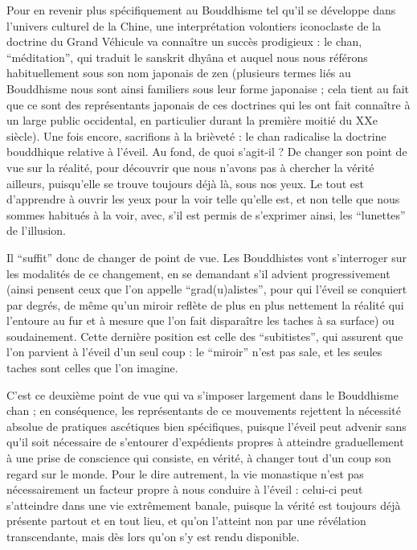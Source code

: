 \documentclass[11pt,a4paper]{article} %
\begin{document}
Pour en revenir plus spécifiquement au Bouddhisme tel qu'il se développe dans
l'univers culturel de la Chine, une interprétation volontiers iconoclaste de la doctrine du
Grand Véhicule va connaître un succès prodigieux : le chan, ``méditation'', qui traduit
le sanskrit dhyâna et auquel nous nous référons habituellement sous son nom japonais
de zen (plusieurs termes liés au Bouddhisme nous sont ainsi familiers sous leur forme
japonaise ; cela tient au fait que ce sont des représentants japonais de ces doctrines qui
les ont fait connaître à un large public occidental, en particulier durant la première moitié du XXe siècle).
Une fois encore, sacrifions à la brièveté : le chan radicalise la
doctrine bouddhique relative à l'éveil.
Au fond, de quoi s'agit-il ? De changer son point
de vue sur la réalité, pour découvrir que nous n'avons pas à chercher la vérité ailleurs,
puisqu'elle se trouve toujours déjà là, sous nos yeux.
Le tout est d'apprendre à ouvrir les
yeux pour la voir telle qu'elle est, et non telle que nous sommes habitués à la voir, avec,
s'il est permis de s'exprimer ainsi, les ``lunettes'' de l'illusion.

Il ``suffit'' donc de changer de point de vue.
Les Bouddhistes vont s'interroger sur les
modalités de ce changement, en se demandant s'il advient progressivement (ainsi pensent ceux que l'on appelle ``grad(u)alistes'', pour qui l'éveil se conquiert par degrés, de
même qu'un miroir reflète de plus en plus nettement la réalité qui l'entoure au fur et à
mesure que l'on fait disparaître les taches à sa surface) ou soudainement.
Cette dernière
position est celle des ``subitistes'', qui assurent que l'on parvient à l'éveil d'un seul
coup : le ``miroir'' n'est pas sale, et les seules taches sont celles que l'on imagine.

C'est ce deuxième point de vue qui va s'imposer largement dans le Bouddhisme chan ;
en conséquence, les représentants de ce mouvements rejettent la nécessité absolue de
pratiques ascétiques bien spécifiques, puisque l'éveil peut advenir sans qu'il soit nécessaire de s'entourer d'expédients propres à atteindre graduellement à une prise de
conscience qui consiste, en vérité, à changer tout d'un coup son regard sur le monde.
Pour le dire autrement, la vie monastique n'est pas nécessairement un facteur propre à
nous conduire à l'éveil : celui-ci peut s'atteindre dans une vie extrêmement banale,
puisque la vérité est toujours déjà présente partout et en tout lieu, et qu'on l'atteint non
par une révélation transcendante, mais dès lors qu'on s'y est rendu disponible.
\end{document}
